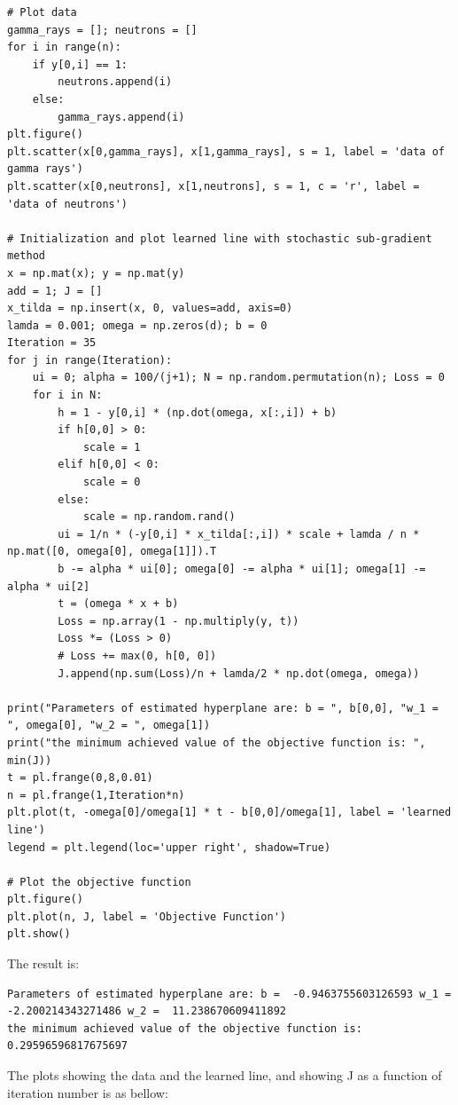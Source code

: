 \documentclass[letterpaper,11pt]{article}
\begin{document}
\begin{spacing}{1.2}
\begin{lstlisting}
# Plot data
gamma_rays = []; neutrons = []
for i in range(n):
    if y[0,i] == 1:
        neutrons.append(i)
    else:
        gamma_rays.append(i)
plt.figure()
plt.scatter(x[0,gamma_rays], x[1,gamma_rays], s = 1, label = 'data of gamma rays')
plt.scatter(x[0,neutrons], x[1,neutrons], s = 1, c = 'r', label = 'data of neutrons')

# Initialization and plot learned line with stochastic sub-gradient method
x = np.mat(x); y = np.mat(y)
add = 1; J = []
x_tilda = np.insert(x, 0, values=add, axis=0)
lamda = 0.001; omega = np.zeros(d); b = 0
Iteration = 35
for j in range(Iteration):
    ui = 0; alpha = 100/(j+1); N = np.random.permutation(n); Loss = 0
    for i in N:
        h = 1 - y[0,i] * (np.dot(omega, x[:,i]) + b)
        if h[0,0] > 0:
            scale = 1
        elif h[0,0] < 0:
            scale = 0
        else:
            scale = np.random.rand()
        ui = 1/n * (-y[0,i] * x_tilda[:,i]) * scale + lamda / n * np.mat([0, omega[0], omega[1]]).T
        b -= alpha * ui[0]; omega[0] -= alpha * ui[1]; omega[1] -= alpha * ui[2]
        t = (omega * x + b)
        Loss = np.array(1 - np.multiply(y, t))
        Loss *= (Loss > 0)
        # Loss += max(0, h[0, 0])
        J.append(np.sum(Loss)/n + lamda/2 * np.dot(omega, omega))

print("Parameters of estimated hyperplane are: b = ", b[0,0], "w_1 = ", omega[0], "w_2 = ", omega[1])
print("the minimum achieved value of the objective function is: ", min(J))
t = pl.frange(0,8,0.01)
n = pl.frange(1,Iteration*n)
plt.plot(t, -omega[0]/omega[1] * t - b[0,0]/omega[1], label = 'learned line')
legend = plt.legend(loc='upper right', shadow=True)

# Plot the objective function
plt.figure()
plt.plot(n, J, label = 'Objective Function')
plt.show()
\end{lstlisting}
The result is:
\begin{lstlisting}
Parameters of estimated hyperplane are: b =  -0.9463755603126593 w_1 =  -2.200214343271486 w_2 =  11.238670609411892
the minimum achieved value of the objective function is:  0.29596596817675697
\end{lstlisting}

The plots showing the data and the learned line, and showing J as a function of iteration number is as bellow:


\end{spacing}
\end{document}
